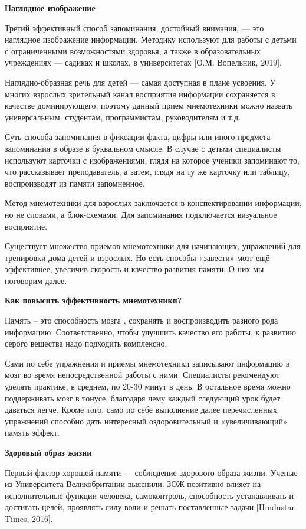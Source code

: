 \textbf{Наглядное изображение}

Третий эффективный способ запоминания, достойный внимания, --- это наглядное изображение информации. Методику используют для работы с детьми с ограниченными возможностями здоровья, а также в образовательных учреждениях --- садиках и школах, в университетах [О.М. Вопельник, 2019].

Наглядно-образная речь для детей --- самая доступная в плане усвоения. У многих взрослых зрительный канал восприятия информации сохраняется в качестве доминирующего, поэтому данный прием мнемотехники можно назвать универсальным.  студентам, программистам, руководителям и т.д.

Суть способа запоминания в фиксации факта, цифры или иного предмета запоминания в образе в буквальном смысле. В случае с детьми специалисты используют карточки с изображениями, глядя на которое ученики запоминают то, что рассказывает преподаватель, а затем, глядя на ту же карточку или таблицу, воспроизводят из памяти запомненное.

Метод мнемотехники для взрослых заключается в конспектировании информации, но не словами, а блок-схемами. Для запоминания подключается визуальное восприятие.

Существует множество приемов мнемотехники для начинающих, упражнений для тренировки дома детей и взрослых. Но есть способы «завести» мозг ещё эффективнее, увеличив скорость и качество развития памяти. О них мы поговорим далее.

\textbf{Как повысить эффективность мнемотехники?}

Память -- это способность мозга , сохранять и воспроизводить разного рода информацию. Соответственно, чтобы улучшить качество его работы, к развитию серого вещества надо подходить комплексно.

Сами по себе упражнения и приемы мнемотехники записывают информацию в мозг во время непосредственной работы с ними. Специалисты рекомендуют уделять практике, в среднем, по 20-30 минут в день. В остальное время можно поддерживать мозг в тонусе, благодаря чему каждый следующий урок будет даваться легче. Кроме того, само по себе выполнение далее перечисленных упражнений способно дать интересный оздоровительный и «увеличивающий» память эффект.

\textbf{Здоровый образ жизни}

Первый фактор хорошей памяти --- соблюдение здорового образа жизни. Ученые из Университета Великобритании выяснили: ЗОЖ позитивно влияет на исполнительные функции человека, самоконтроль, способность устанавливать и достигать целей, проявлять силу воли и решать поставленные задачи [Hindustan Times, 2016].

